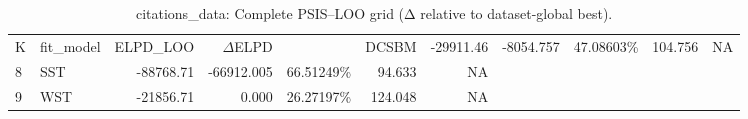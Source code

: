 \begin{table}[!h]
\centering
\caption{citations_data: Complete PSIS–LOO grid (Δ relative to dataset-global best).\\\label{tab:app-citations_data-A-psisloo-full}}
\centering
\begin{tabular}[t]{llrrrrr}
\toprule
K & fit_model & ELPD\_LOO & $\Delta$ELPD & %
 & DCSBM & -29911.46 & -8054.757 & 47.08603\% & 104.756 & NA\\
8 & SST & -88768.71 & -66912.005 & 66.51249\% & 94.633 & NA\\
9 & WST & -21856.71 & 0.000 & 26.27197\% & 124.048 & NA\\
\bottomrule
\end{tabular}
\end{table}

